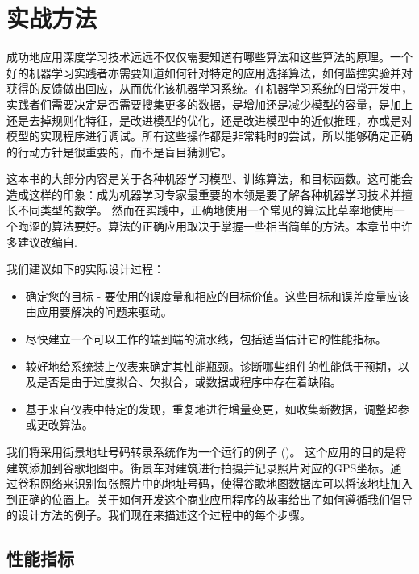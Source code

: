 \chapter{实战方法}
\label{chap:11}

成功地应用深度学习技术远远不仅仅需要知道有哪些算法和这些算法的原理。一个好的机器学习实践者亦需要知道如何针对特定的应用选择算法，如何监控实验并对获得的反馈做出回应，从而优化该机器学习系统。在机器学习系统的日常开发中，实践者们需要决定是否需要搜集更多的数据，是增加还是减少模型的容量，是加上还是去掉规则化特征，是改进模型的优化，还是改进模型中的近似推理，亦或是对模型的实现程序进行调试。所有这些操作都是非常耗时的尝试，所以能够确定正确的行动方针是很重要的，而不是盲目猜测它。

这本书的大部分内容是关于各种机器学习模型、训练算法，和目标函数。这可能会造成这样的印象：成为机器学习专家最重要的本领是要了解各种机器学习技术并擅长不同类型的数学。 然而在实践中，正确地使用一个常见的算法比草率地使用一个晦涩的算法要好。算法的正确应用取决于掌握一些相当简单的方法。本章节中许多建议改编自\cite{Ng ( 2015 )}.

我们建议如下的实际设计过程：
\begin{itemize}
\item 确定您的目标 - 要使用的误度量和相应的目标价值。这些目标和误差度量应该由应用要解决的问题来驱动。
\item 尽快建立一个可以工作的端到端的流水线，包括适当估计它的性能指标。
\item 较好地给系统装上仪表来确定其性能瓶颈。诊断哪些组件的性能低于预期，以及是否是由于过度拟合、欠拟合，或数据或程序中存在着缺陷。
\item 基于来自仪表中特定的发现，重复地进行增量变更，如收集新数据，调整超参或更改算法。
\end{itemize}

我们将采用街景地址号码转录系统作为一个运行的例子 (\cite{ Goodfellow et al. , 2014d })。 这个应用的目的是将建筑添加到谷歌地图中。街景车对建筑进行拍摄并记录照片对应的GPS坐标。通过卷积网络来识别每张照片中的地址号码，使得谷歌地图数据库可以将该地址加入到正确的位置上。关于如何开发这个商业应用程序的故事给出了如何遵循我们倡导的设计方法的例子。我们现在来描述这个过程中的每个步骤。

\section{性能指标}

